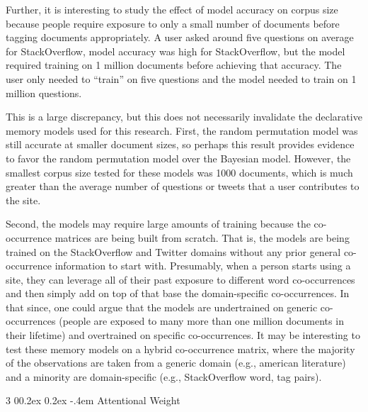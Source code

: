 \documentclass[man,floatsintext,donotrepeattitle]{apa6}
\makeatletter
\renewcommand{\subsubsection}{%
  \@startsection
  {subsubsection}%
  {3}%
  {\parindent}%
  {0\baselineskip \@plus 0.2ex \@minus 0.2ex}%
  {-.4em}%
  {\normalfont\normalsize\bfseries\addperi}}
\makeatother
\begin{document}
Further, it is interesting to study the effect of model accuracy on corpus size because people require exposure to only a small number of documents before tagging documents appropriately.
A user asked around five questions on average for StackOverflow, model accuracy was high for StackOverflow, but the model required training on 1 million documents before achieving that accuracy.
The user only needed to ``train'' on five questions and the model needed to train on 1 million questions.

This is a large discrepancy, but this does not necessarily invalidate the declarative memory models used for this research.
First, the random permutation model was still accurate at smaller document sizes, so perhaps this result provides evidence to favor the random permutation model over the Bayesian model.
However, the smallest corpus size tested for these models was \num{1000} documents, which is much greater than the average number of questions or tweets that a user contributes to the site.

Second, the models may require large amounts of training because the co-occurrence matrices are being built from scratch.
That is, the models are being trained on the StackOverflow and Twitter domains without any prior general co-occurrence information to start with.
Presumably, when a person starts using a site, they can leverage all of their past exposure to different word co-occurrences and then simply add on top of that base the domain-specific co-occurrences.
In that since, one could argue that the models are undertrained on generic co-occurrences (people are exposed to many more than one million documents in their lifetime) and overtrained on specific co-occurrences.
It may be interesting to test these memory models on a hybrid co-occurrence matrix,
where the majority of the observations are taken from a generic domain (e.g., american literature) and a minority are domain-specific (e.g., StackOverflow word, tag pairs).

\subsubsection{Attentional Weight}
\end{document}
